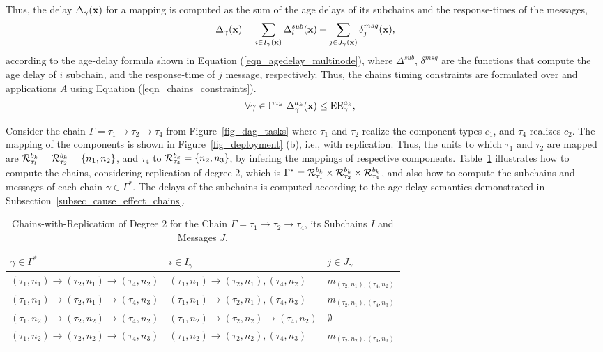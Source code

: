Thus, the delay $\Delta_\gamma(\textbf{x})$ for a mapping \ttx is computed as the sum of the age delays of its subchains and the response-times of the messages,
\[
	\Delta_{\gamma}(\textbf{x})=\sum_{i\in I_{\gamma}(\textbf{x})}{\Delta^{sub}_{i}(\textbf{x})} + \sum_{j\in J_{\gamma}(\textbf{x})}{\delta^{msg}_j(\textbf{x})},
\]
according to the age-delay formula shown in Equation (\ref{eqn_agedelay_multinode}), where $\Delta^{sub}$, $\delta^{msg}$ are the functions that compute the age delay of $i$ subchain, and the response-time of $j$ message, respectively. Thus, the chains timing constraints are formulated over \ttx and applications $A$ using Equation (\ref{eqn_chains_constraints}).
\begin{align}
\label{eqn_chains_constraints}
\forall \gamma \in \ssp{\Gamma} \ \sss{\Delta}[k][{\gamma}](\x) & \leq \sss{\mathrm{EE}}[k][\gamma],
\end{align}
\begin{example} Consider the chain $\Gamma=\tau_1\rightarrow\tau_2\rightarrow\tau_4$ from Figure~\ref{fig_dag_tasks} where $\tau_1$ and $\tau_2$ realize the component types $c_1$, and $\tau_4$ realizes $c_2$. The mapping of the components is shown in Figure~\ref{fig_deployment} (b), i.e., with replication. Thus, the units to which $\tau_1$ and $\tau_2$ are mapped are $\sss{\mathcal{R}}[k][\tau_l][b]=\sss{\mathcal{R}}[k][\tau_2][b]=\{n_1,n_2\}$, and $\tau_4$ to $\sss{\mathcal{R}}[k][\tau_4][b]=\{n_2,n_3\}$, by infering the mappings of respective components. Table~\ref{tbl_chains_with_replication} illustrates how to compute the chains, considering replication of degree 2, which is $\Gamma^* = \sss{\mathcal{R}}[k][\tau_1][b] \times \sss{\mathcal{R}}[k][\tau_2][b] \times \sss{\mathcal{R}}[k][\tau_4][b]$, and also how to compute the subchains and messages of each chain $\gamma\in \Gamma^*$. The delays of the subchains is computed according to the age-delay semantics demonstrated in Subsection~\ref{subsec_cause_effect_chains}.
\end{example} 
\begin{table}[]
	\begin{tabular}{@{}lll@{}}
		\toprule
		$\gamma\in \Gamma^*$ & $i\in I_\gamma$ & $j\in J_\gamma$ \\ \midrule
		$(\tau_1,n_1)\rightarrow (\tau_2,n_1)\rightarrow(\tau_4,n_2)$ & $(\tau_1,n_1)\rightarrow (\tau_2,n_1),(\tau_4,n_2)$ & $m_{(\tau_2,n_1), (\tau_4,n_2)}$ \\
		$(\tau_1,n_1)\rightarrow (\tau_2,n_1)\rightarrow(\tau_4,n_3)$ & $(\tau_1,n_1)\rightarrow (\tau_2,n_1),(\tau_4,n_3)$ & $m_{(\tau_2,n_1), (\tau_4,n_3)}$ \\
		$(\tau_1,n_2)\rightarrow(\tau_2,n_2)\rightarrow(\tau_4,n_2)$ & $(\tau_1,n_2)\rightarrow(\tau_2,n_2)\rightarrow(\tau_4,n_2)$ & $\emptyset$ \\
		$(\tau_1,n_2)\rightarrow(\tau_2,n_2)\rightarrow(\tau_4,n_3)$ & $(\tau_1,n_2)\rightarrow(\tau_2,n_2),(\tau_4,n_3)$ & $m_{(\tau_2,n_2), (\tau_4,n_3)}$ \\ \bottomrule
	\end{tabular}
\caption{Chains-with-Replication of Degree 2 for the Chain $\Gamma=\tau_1\rightarrow\tau_2\rightarrow\tau_4$, its Subchains $I$ and Messages $J$.}
\label{tbl_chains_with_replication}
\end{table}

